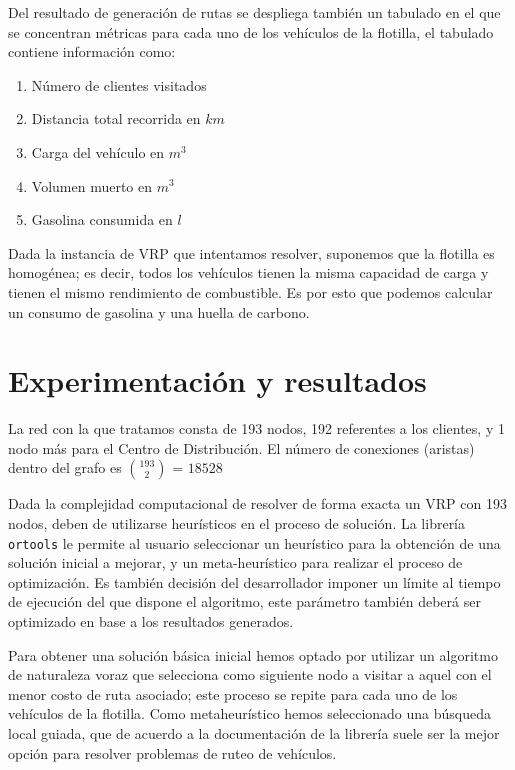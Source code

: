 \documentclass[journal]{IEEEtran}
\begin{document}
            Del resultado de generación de rutas se despliega también un tabulado en el que se concentran métricas para cada uno de los vehículos de la flotilla, el tabulado contiene información como:
            \begin{enumerate}
                \item Número de clientes visitados
                \item Distancia total recorrida en $km$
                \item Carga del vehículo en $m^{3}$
                \item Volumen muerto en $m^{3}$
                \item Gasolina consumida en $l$
            \end{enumerate}

            Dada la instancia de VRP que intentamos resolver, suponemos que la flotilla es homogénea; es decir, todos los vehículos tienen la misma capacidad de carga y tienen el mismo rendimiento de combustible. Es por esto que podemos calcular un consumo de gasolina y una huella de carbono.
            
    \section{Experimentación y resultados} \label{sec:experimentation}
    
        La red con la que tratamos consta de 193 nodos, 192 referentes a los clientes, y 1 nodo más para el Centro de Distribución. El número de conexiones (aristas) dentro del grafo es $193\choose2$ = $18528$
        
        Dada la complejidad computacional de resolver de forma exacta un VRP con 193 nodos, deben de utilizarse heurísticos en el proceso de solución. La librería \texttt{ortools} \cite{ortools} le permite al usuario seleccionar un heurístico para la obtención de una solución inicial a mejorar, y un meta-heurístico para realizar el proceso de optimización. Es también decisión del desarrollador imponer un límite al tiempo de ejecución del que dispone el algoritmo, este parámetro también deberá ser optimizado en base a los resultados generados.

        Para obtener una solución básica inicial hemos optado por utilizar un algoritmo de naturaleza voraz que selecciona como siguiente nodo a visitar a aquel con el menor costo de ruta asociado; este proceso se repite para cada uno de los vehículos de la flotilla. Como metaheurístico hemos seleccionado una búsqueda local guiada, que de acuerdo a la documentación de la librería \cite{google-2021} suele ser la mejor opción para resolver problemas de ruteo de vehículos.
\end{document}
